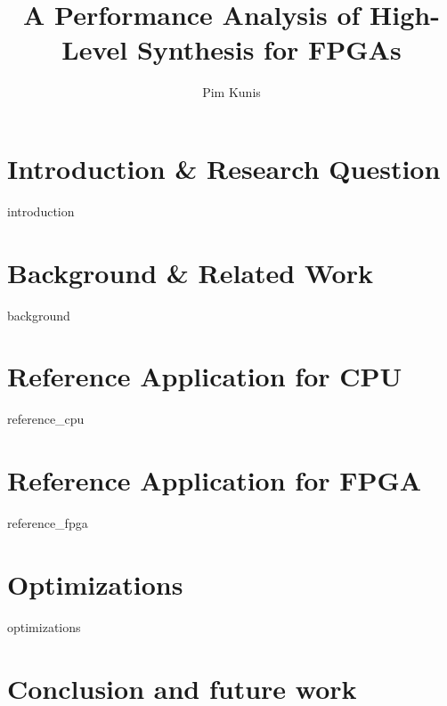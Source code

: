 \documentclass[twoside]{uva-inf-bachelor-thesis}
\title{A Performance Analysis of High-Level Synthesis for FPGAs}
\author{Pim Kunis}
\begin{document}
\maketitle

\begin{abstract}
\end{abstract}

\tableofcontents

\chapter{Introduction \& Research Question} \label{chapter:intro_question}
{introduction}

\chapter{Background \& Related Work} \label{chapter:background_related}
{background}

\chapter{Reference Application for CPU} \label{chapter:cpu}
{reference_cpu}

\chapter{Reference Application for FPGA} \label{chapter:fpga}
{reference_fpga}

\chapter{Optimizations} \label{chapter:optimizations}
{optimizations}

\chapter{Conclusion and future work} \label{chapter:conclusion}

\printbibliography
\end{document}
